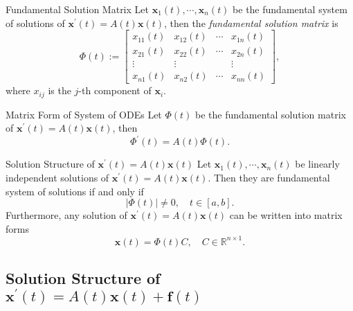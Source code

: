 \begin{definition}{Fundamental Solution Matrix}{}
  Let $\mathbf{x}_1(t),\cdots,\mathbf{x}_n(t)$ be the fundamental system of solutions of
  $\mathbf{x}^{\prime}(t) = A(t) \mathbf{x}(t)$,
  then the \emph{fundamental solution matrix} is
  \begin{equation}
    \Phi(t) := 
    \begin{bmatrix}
      x_{11}(t) & x_{12}(t) & \cdots & x_{1n}(t)\\
      x_{21}(t) & x_{22}(t) & \cdots & x_{2n}(t)\\
      \vdots & \vdots & & \vdots\\
      x_{n1}(t) & x_{n2}(t) & \cdots & x_{nn}(t)
    \end{bmatrix},
  \end{equation}
  where $x_{ij}$ is the $j$-th component of $\mathbf{x}_i$.
\end{definition}

\begin{proposition}{Matrix Form of System of ODEs}{}
  Let $\Phi(t)$ be the fundamental solution matrix of $\mathbf{x}^{\prime}(t) = A(t)\mathbf{x}(t)$,
  then
  \begin{equation}
    \Phi^{\prime}(t) = A(t) \Phi(t).
  \end{equation}
\end{proposition}

\begin{proposition}{Solution Structure of $\mathbf{x}^{\prime}(t) = A(t) \mathbf{x}(t)$}{}
  Let $\mathbf{x}_1(t),\cdots,\mathbf{x}_n(t)$ be linearly independent solutions
  of $\mathbf{x}^{\prime}(t) = A(t) \mathbf{x}(t)$.
  Then they are fundamental system of solutions if and only if
  \begin{equation}
    |\Phi(t)| \neq 0, \quad t \in [a,b].
  \end{equation}
  Furthermore, any solution of $\mathbf{x}^{\prime}(t) = A(t)\mathbf{x}(t)$ can be written into matrix forms
  \begin{equation}
    \mathbf{x}(t) = \Phi(t)C, \quad C \in \mathbb{R}^{n \times 1}.
  \end{equation}
\end{proposition}

\subsection{Solution Structure of $\mathbf{x}^{\prime}(t) = A(t) \mathbf{x}(t) + \mathbf{f}(t)$}

